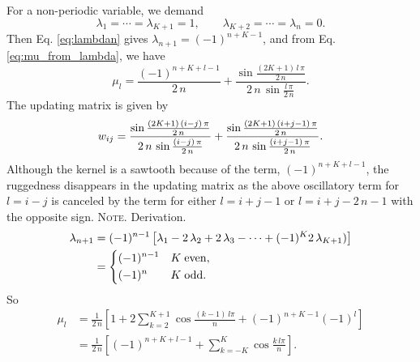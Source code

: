\documentclass[reprint, superscriptaddress, floatfix]{revtex4-1}
\newcommand{\note}[1]{{\color{DarkGreen}\footnotesize \textsc{Note.} #1}}
\begin{document}
For a non-periodic variable, we demand
$$
\lambda_1 = \cdots = \lambda_{K+1} = 1,
\qquad
\lambda_{K+2} = \cdots = \lambda_n = 0.
$$
Then Eq. \eqref{eq:lambdan} gives
$\lambda_{n+1} = (-1)^{n+K-1}$,
and from Eq. \eqref{eq:mu_from_lambda},
we have
\begin{equation}
  \mu_l
  =
  \frac{ (-1)^{n+K+l-1} } { 2 \, n }
    +
  \frac{
    \sin
    \frac{ (2 K + 1) \, l \, \pi }
         {         2 \, n        }
  }
  {
    2 \, n \, \sin \frac{ l \, \pi } { 2 \, n }
  }
  .
\label{eq:mu_sinc_refl}
\end{equation}
%
The updating matrix is given by
%
\begin{equation}
  w_{ij}
  =
    \frac{
      \sin
      \frac{ (2 K + 1) \, (i-j) \, \pi }
           {         2 \, n        }
    }
    {
      2 \, n \, \sin \frac{ (i-j) \, \pi } { 2 \, n }
    }
    +
    \frac{
      \sin
      \frac{ (2 K + 1) \, (i+j-1) \, \pi }
           {         2 \, n        }
    }
    {
      2 \, n \, \sin \frac{ (i+j-1) \, \pi } { 2 \, n }
    }
  .
  \notag
\end{equation}
%
Although the kernel is a sawtooth
because of the term, $(-1)^{n+K+l-1}$,
the ruggedness disappears
in the updating matrix
as the above oscillatory term for $l = i - j$
is canceled by the term for either $l = i + j - 1$
or $l = i + j - 2 \, n - 1$
with the opposite sign.
%
\note{Derivation.
$$
\begin{aligned}
  \lambda_{n+1}
  &=
  (-1)^{n-1}
  \left[
    \lambda_1
    - 2 \, \lambda_2
    + 2 \, \lambda_3 - \cdots
    + (-1)^{K} 2 \, \lambda_{K+1})
  \right]
  \\
  &=
  \begin{dcases}
    (-1)^{n-1} & K \mathrm{\; even,} \\
    (-1)^n     & K \mathrm{\; odd.}
  \end{dcases}
\end{aligned}
$$
So
$$
\begin{aligned}
  \mu_l
  &=
  \frac{1}{2\,n}
  \left[
    1 +
    2 \sum_{k=2}^{K+1}
    \cos \frac { (k - 1) \, l \pi } { n }
    +
    (-1)^{n+K-1} (-1)^l
  \right]
  \\
  &=
  \frac{1}{2\,n}
  \left[
    (-1)^{n+K+l-1}
    +
    \sum_{k=-K}^{K}
    \cos \frac { k \, l \pi } { n }
  \right]
  .
\end{aligned}
$$
}%
\end{document}

